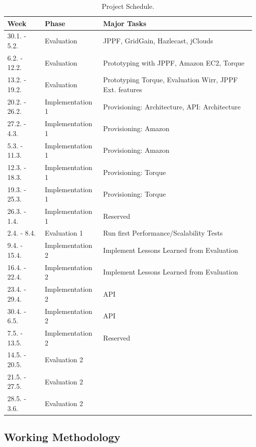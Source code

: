 \documentclass[12pt]{article}
\begin{document}
\begin{table}[hptb]
\centering
\begin{tabular}{|l|l|p{7cm}|}
\hline
\textbf{Week} & \textbf{Phase} & \textbf{Major Tasks} \\ \hline
30.1. - 5.2. & Evaluation & JPPF, GridGain, Hazlecast, jClouds \\ \hline
6.2. - 12.2. & Evaluation & Prototyping with JPPF, Amazon EC2, Torque \\ \hline
13.2. - 19.2. & Evaluation & Prototyping Torque, Evaluation Wirr, JPPF Ext. features \\ \hline
20.2. - 26.2. & Implementation 1 & Provisioning: Architecture, API: Architecture \\ \hline
27.2. - 4.3. & Implementation 1 & Provisioning: Amazon \\ \hline
5.3. - 11.3. & Implementation 1 & Provisioning: Amazon \\ \hline
12.3. - 18.3. & Implementation 1 & Provisioning: Torque \\ \hline
19.3. - 25.3. & Implementation 1 & Provisioning: Torque \\ \hline
26.3. - 1.4. & Implementation 1 & Reserved \\ \hline
2.4. - 8.4. & Evaluation 1 & Run first Performance/Scalability Tests \\ \hline
9.4. - 15.4. & Implementation 2 & Implement Lessons Learned from Evaluation \\ \hline
16.4. - 22.4. & Implementation 2 & Implement Lessons Learned from Evaluation \\ \hline
23.4. - 29.4. & Implementation 2 & API \\ \hline
30.4. - 6.5. & Implementation 2 & API \\ \hline
7.5. - 13.5. & Implementation 2 & Reserved \\ \hline
14.5. - 20.5. & Evaluation 2 &  \\ \hline
21.5. - 27.5. & Evaluation 2 &  \\ \hline
28.5. - 3.6. & Evaluation 2 &  \\ \hline
\end{tabular}
\caption{Project Schedule.}
\label{tab:schedule}
\end{table}

\subsection{Working Methodology}
\end{document}

